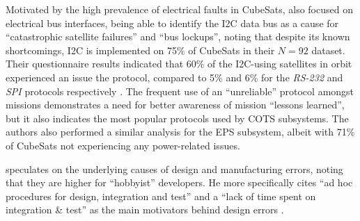 \documentclass[a4paper,nobib,justified,final]{tufte-book}
\begin{document}
Motivated by the high prevalence of electrical faults in CubeSats, \citeauthor{bouwmeesterSurveyImplementationReliability2017} also focused on electrical bus interfaces, being able to identify the \acs{I2C} data bus as a cause for ``catastrophic satellite failures'' and ``bus lockups'', noting that despite its known shortcomings, \acs{I2C} is implemented on 75\% of CubeSats in their \(N=92\) dataset. Their questionnaire results indicated that 60\% of the \acs{I2C}-using satellites in orbit experienced an issue the protocol, compared to 5\% and 6\% for the \emph{RS-232} and \emph{SPI} protocols respectively \autocite{bouwmeesterSurveyImplementationReliability2017}.
The frequent use of an ``unreliable'' protocol amongst missions demonstrates a need for better awareness of mission ``lessons learned'', but it also indicates the most popular protocols used by \acs{COTS} subsystems.
The authors also performed a similar analysis for the \acs{EPS} subsystem, albeit with 71\% of CubeSats not experiencing any power-related issues. 

\citeauthor{swartwoutCubeSatMissionSuccess2019} speculates on the underlying causes of design and manufacturing errors, noting that they are higher for ``hobbyist'' developers. He more specifically cites ``ad hoc procedures for design, integration and test'' and a ``lack of time spent on integration \& test'' as the main motivators behind design errors \cite{swartwoutCubeSatMissionSuccess2019}. 
\end{document}
